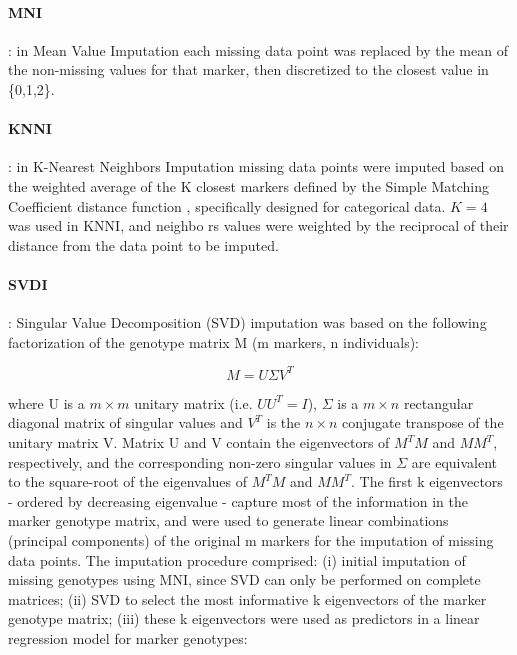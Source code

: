 \paragraph{MNI}
\label{par:MNI}
: in Mean Value Imputation each missing data point was replaced by the mean of the non-missing values for that marker, then discretized to the closest value in \{0,1,2\}.
\paragraph{KNNI}
\label{par:KNNI}
: in K-Nearest Neighbors Imputation missing data points were imputed based on the weighted average of the K closest markers \cite{troyanskaya_missing_2001} defined by the Simple Matching Coefficient distance function \cite{schwender_statistical_2007}, specifically designed for categorical data. $K=4$ was used in KNNI, and neighbo
rs values were weighted by the reciprocal of their distance from the data point to be imputed.
\paragraph{SVDI}
\label{par:SVDI}
: Singular Value Decomposition (SVD) imputation was based on the following factorization of the genotype matrix M (m markers, n individuals):

\begin{equation}
\label{eq:SVDI_general}
M = U\Sigma V^{T}
\end{equation}

where U is a $m \times m$ unitary matrix (i.e. $UU^{T}=I$), $\Sigma$ is a $m \times n$ rectangular diagonal matrix of singular values and $V^{T}$ is the $n \times n$ conjugate transpose of the unitary matrix V. Matrix U and V contain the eigenvectors of $M^{T}M$ and $MM^{T}$, respectively, and the corresponding non-zero singular values in $\Sigma$ are equivalent to the square-root of the eigenvalues of $M^{T}M$ and $MM^{T}$. The first k eigenvectors - ordered by decreasing eigenvalue - capture most of the information in the marker genotype matrix, and were used to generate linear combinations (principal components) of the original m markers for the imputation of missing data points. The imputation procedure comprised: (i) initial imputation of missing genotypes using MNI, since SVD can only be performed on complete matrices; (ii) SVD to select the most informative k eigenvectors of the marker genotype matrix; (iii) these k eigenvectors were used as predictors in a linear regression model for marker genotypes:

